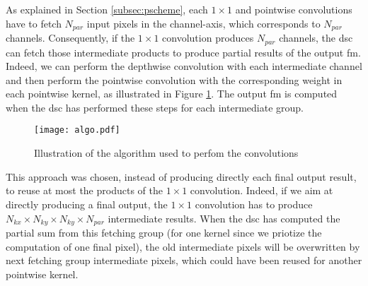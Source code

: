 As explained in Section \ref{subsec:pscheme}, each $1 \times 1$ and pointwise convolutions have to fetch $N_{par}$ input pixels in the channel-axis, which corresponds to $N_{par}$ channels. Consequently, if the $1 \times 1$ convolution produces $N_{par}$ channels, the \acrshort{dsc} can fetch those intermediate products to produce partial results of the output \acrshort{fm}. Indeed, we can perform the depthwise convolution with each intermediate channel and then perform the pointwise convolution with the corresponding weight in each pointwise kernel, as illustrated in Figure \ref{fig:algo}. The output \acrshort{fm} is computed when the \acrshort{dsc} has performed these steps for each intermediate group.
%
\begin{figure}[H]
    \centering
    \texttt{[image: algo.pdf]}
    \caption{Illustration of the algorithm used to perfom the convolutions}
    \label{fig:algo}
\end{figure}

This approach was chosen, instead of producing directly each final output result, to reuse at most the products of the $1 \times 1$ convolution. Indeed, if we aim at directly producing a final output, the $1 \times 1$ convolution has to produce $N_{kx} \times N_{ky} \times N_{ky} \times N_{par}$ intermediate results. When the \acrshort{dsc} has computed the partial sum from this fetching group (for one kernel since we priotize the computation of one final pixel), the old intermediate pixels will be overwritten by next fetching group intermediate pixels, which could have been reused for another pointwise kernel.

